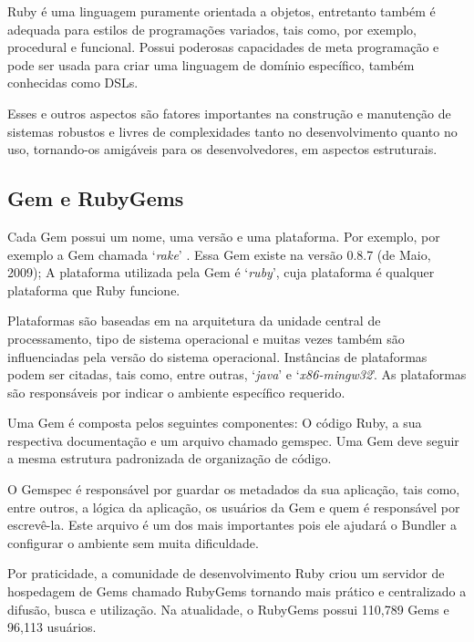 Ruby é uma linguagem puramente orientada a objetos, entretanto também é adequada para estilos de programações variados, tais como, por exemplo, procedural e funcional. Possui poderosas capacidades de meta programação e pode ser usada para criar uma linguagem de domínio específico, também conhecidas como DSLs.

Esses e outros aspectos são fatores importantes na construção e manutenção de sistemas robustos e livres de complexidades tanto no desenvolvimento quanto no uso, tornando-os amigáveis para os desenvolvedores, em aspectos estruturais. \cite{flanagan2008ruby}

\subsection{Gem e RubyGems}

Cada Gem possui um nome, uma versão e uma plataforma. Por exemplo, por exemplo a Gem chamada `\textit{rake}' \cite{rake2014}. Essa Gem existe na versão 0.8.7 (de Maio, 2009); A plataforma utilizada pela Gem é `\textit{ruby}', cuja plataforma é qualquer plataforma que Ruby funcione. \cite{berube2007practical}

Plataformas são baseadas em na arquitetura da unidade central de processamento, tipo de sistema operacional e muitas vezes também são influenciadas pela versão do sistema operacional. Instâncias de plataformas podem ser citadas, tais como, entre outras, `\textit{java}' e `\textit{x86-mingw32}'. As plataformas são responsáveis por indicar o ambiente específico requerido.

Uma Gem é composta pelos seguintes componentes: O código Ruby, a sua respectiva documentação e um arquivo chamado gemspec. Uma Gem deve seguir a mesma estrutura padronizada de organização de código.

O Gemspec é responsável por guardar os metadados da sua aplicação, tais como, entre outros, a lógica da aplicação, os usuários da Gem e quem é responsável por escrevê-la. Este arquivo é um dos mais importantes pois ele ajudará o Bundler a configurar o ambiente sem muita dificuldade.

Por praticidade, a comunidade de desenvolvimento Ruby criou um servidor de hospedagem de Gems chamado RubyGems tornando mais prático e centralizado a difusão, busca e utilização. Na atualidade, o RubyGems possui 110,789 Gems e 96,113 usuários.
